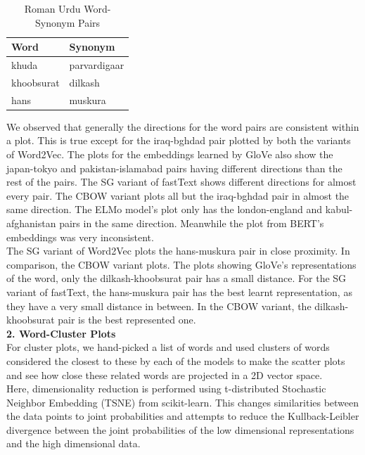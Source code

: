 \documentclass[format=acmsmall,review=true,screen=true]{acmart}
\begin{document}
        \begin{table}[]
    \begin{tabular}{|l|l|}
        \hline
                            \textbf{Word} & \textbf{Synonym}    \\
    \hline
    khuda          &      parvardigaar\\
       \hline
    \hline
    khoobsurat            &      dilkash\\
       \hline
    \hline
    hans            &      muskura\\
       \hline

    \end{tabular}
        \caption{\label{tab:table-name}Roman Urdu Word-Synonym Pairs}
    \end{table}
We observed that generally the directions for the word pairs are consistent within a plot. This is true except for the iraq-bghdad pair plotted by both the variants of Word2Vec. The plots for the embeddings learned by GloVe also show the japan-tokyo and pakistan-islamabad pairs having different directions than the rest of the pairs. The SG variant of fastText shows different directions for almost every pair. The CBOW variant plots all but the iraq-bghdad pair in almost the same direction. The ELMo model’s plot only has the london-england and kabul-afghanistan pairs in the same direction. Meanwhile the plot from BERT’s embeddings was very inconsistent.\\

The SG variant of Word2Vec plots the hans-muskura pair in close proximity. In comparison, the CBOW variant plots. The plots showing GloVe’s representations of the word, only the dilkash-khoobsurat pair has a small distance. For the SG variant of fastText, the hans-muskura pair has the best learnt representation, as they have a very small distance in between. In the CBOW variant, the dilkash-khoobsurat pair is the best represented one.\\

\textbf{2. Word-Cluster Plots}\\
For cluster plots, we hand-picked a list of words and used clusters of words considered the closest to these by each of the models to make the scatter plots and see how close these related words are projected in a 2D vector space.\\

Here, dimensionality reduction is performed using t-distributed Stochastic Neighbor Embedding (TSNE) from scikit-learn. This changes similarities between the data points to joint probabilities and attempts to reduce the Kullback-Leibler divergence between the joint probabilities of the low dimensional representations and the high dimensional data.\\
\end{document}
